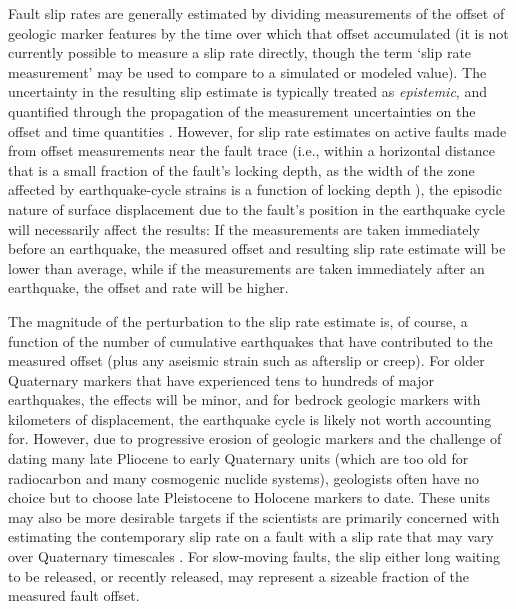 \documentclass[se]{copernicus}
\begin{document}
\introduction

Fault slip rates are generally estimated by dividing measurements of the offset
of geologic marker features by the time over which that offset accumulated (it
is not currently possible to measure a slip rate directly, though the term
`slip rate measurement' may be used to compare to a simulated or modeled
value). The uncertainty in the resulting slip estimate is typically treated as
\emph{epistemic}, and quantified through the propagation of the measurement
uncertainties on the offset and time quantities
\citep[e.g.,][]{bird_uncertainties_2007, zechar_incorporating_2009}.  However,
for slip rate estimates on active faults made from offset measurements near the
fault trace (i.e., within a horizontal distance that is a small fraction of the
fault's locking depth, as the width of the zone affected by earthquake-cycle
strains is a function of locking depth \citep[e.g.,][]{savage_geodetic_1973,
hetland_interseismic_2006}), the episodic nature of surface displacement due to
the fault's position in the earthquake cycle will necessarily affect the
results: If the measurements are taken immediately before an earthquake, the
measured offset and resulting slip rate estimate will be lower than average,
while if the measurements are taken immediately after an earthquake, the offset
and rate will be higher.

The magnitude of the perturbation to the slip rate estimate is, of course, a
function of the number of cumulative earthquakes that have contributed
to the measured offset (plus any aseismic strain such as afterslip or creep).
For older Quaternary markers that have experienced tens to hundreds of major
earthquakes, the effects will be minor, and for bedrock geologic markers with
kilometers of displacement, the earthquake cycle is likely not worth accounting
for. However, due to progressive erosion of geologic markers and the challenge
of dating many late Pliocene to early Quaternary units (which are too old for
radiocarbon and many cosmogenic nuclide systems), geologists often have no
choice but to choose late Pleistocene to Holocene markers to date. These
units may also be more desirable targets if the scientists are primarily
concerned with estimating the contemporary slip rate on a fault with a slip
rate that may vary over Quaternary timescales
\citep[e.g.,][]{rittase_temporal_2014,zinke_highly_2018}. For slow-moving 
faults, the slip either long waiting to be released, or recently released, may 
represent a sizeable fraction of the measured fault offset.
\end{document}
